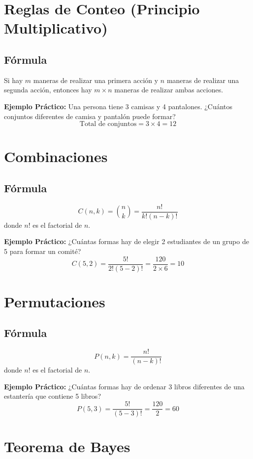 \documentclass[10pt]{article}
\begin{document}
\begin{multicols}{2}
		\section*{Reglas de Conteo (Principio Multiplicativo)}
		
		\subsection*{Fórmula}
		Si hay \( m \) maneras de realizar una primera acción y \( n \) maneras de realizar una segunda acción, entonces hay \( m \times n \) maneras de realizar ambas acciones.
		
		\textbf{Ejemplo Práctico:}  
		Una persona tiene 3 camisas y 4 pantalones. ¿Cuántos conjuntos diferentes de camisa y pantalón puede formar?
		\[
		\text{Total de conjuntos} = 3 \times 4 = 12
		\]
		
		\section*{Combinaciones}
		
		\subsection*{Fórmula}
		\[
		C(n, k) = \binom{n}{k} = \frac{n!}{k!(n - k)!}
		\]
		donde \( n! \) es el factorial de \( n \).
		
		\textbf{Ejemplo Práctico:}  
		¿Cuántas formas hay de elegir 2 estudiantes de un grupo de 5 para formar un comité?
		\[
		C(5, 2) = \frac{5!}{2!(5 - 2)!} = \frac{120}{2 \times 6} = 10
		\]
		
		\section*{Permutaciones}
		
		\subsection*{Fórmula}
		\[
		P(n, k) = \frac{n!}{(n - k)!}
		\]
		donde \( n! \) es el factorial de \( n \).
		
		\textbf{Ejemplo Práctico:}  
		¿Cuántas formas hay de ordenar 3 libros diferentes de una estantería que contiene 5 libros?
		\[
		P(5, 3) = \frac{5!}{(5 - 3)!} = \frac{120}{2} = 60
		\]
		
		\section*{Teorema de Bayes}
		

\end{multicols}
\end{document}
